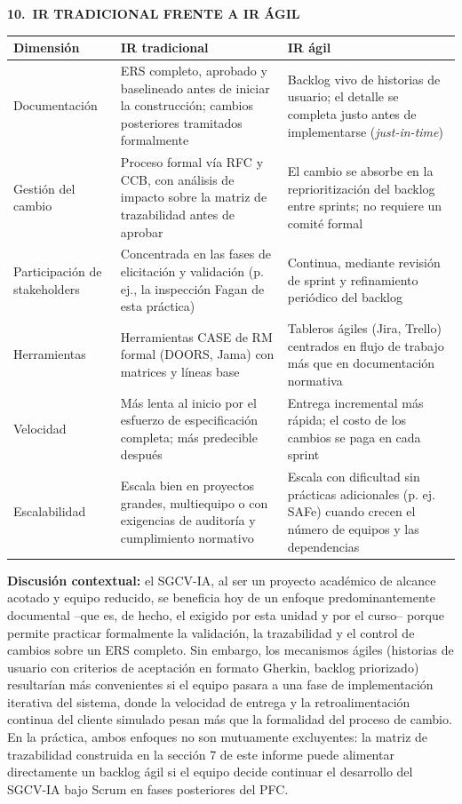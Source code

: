 \documentclass[11pt,a4paper]{article}
\newcommand{\seccion}[2]{%
  \vspace{0.6cm}
  \noindent
  {\color{white}\colorbox{uteqverde}{%
    \parbox[c][1.05cm]{\dimexpr\textwidth-16pt\relax}{%
      \hspace{6pt}\textbf{\large #1\ #2}%
    }%
  }}%
  \vspace{0.35cm}
  \par
}
\begin{document}
\seccion{10.}{IR TRADICIONAL FRENTE A IR ÁGIL}

\begin{longtable}{p{2.6cm}p{4.7cm}p{4.7cm}}
\toprule
\textbf{Dimensión} & \textbf{IR tradicional} & \textbf{IR ágil} \\
\midrule
\endhead
Documentación &
ERS completo, aprobado y baselineado antes de iniciar la construcción; cambios
posteriores tramitados formalmente &
Backlog vivo de historias de usuario; el detalle se completa justo antes de
implementarse (\textit{just-in-time}) \\
\addlinespace
Gestión del cambio &
Proceso formal vía RFC y CCB, con análisis de impacto sobre la matriz de
trazabilidad antes de aprobar &
El cambio se absorbe en la reprioritización del backlog entre sprints; no
requiere un comité formal \\
\addlinespace
Participación de stakeholders &
Concentrada en las fases de elicitación y validación (p. ej., la inspección
Fagan de esta práctica) &
Continua, mediante revisión de sprint y refinamiento periódico del backlog \\
\addlinespace
Herramientas &
Herramientas CASE de RM formal (DOORS, Jama) con matrices y líneas base &
Tableros ágiles (Jira, Trello) centrados en flujo de trabajo más que en
documentación normativa \\
\addlinespace
Velocidad &
Más lenta al inicio por el esfuerzo de especificación completa; más predecible
después &
Entrega incremental más rápida; el costo de los cambios se paga en cada sprint \\
\addlinespace
Escalabilidad &
Escala bien en proyectos grandes, multiequipo o con exigencias de auditoría y
cumplimiento normativo &
Escala con dificultad sin prácticas adicionales (p. ej. SAFe) cuando crecen el
número de equipos y las dependencias \\
\bottomrule
\end{longtable}

\textbf{Discusión contextual:} el SGCV-IA, al ser un proyecto académico de
alcance acotado y equipo reducido, se beneficia hoy de un enfoque
predominantemente documental --que es, de hecho, el exigido por esta unidad y
por el curso-- porque permite practicar formalmente la validación, la
trazabilidad y el control de cambios sobre un ERS completo. Sin embargo, los
mecanismos ágiles (historias de usuario con criterios de aceptación en formato
Gherkin, backlog priorizado) resultarían más convenientes si el equipo pasara a
una fase de implementación iterativa del sistema, donde la velocidad de entrega
y la retroalimentación continua del cliente simulado pesan más que la
formalidad del proceso de cambio. En la práctica, ambos enfoques no son
mutuamente excluyentes: la matriz de trazabilidad construida en la sección 7 de
este informe puede alimentar directamente un backlog ágil si el equipo decide
continuar el desarrollo del SGCV-IA bajo Scrum en fases posteriores del PFC.
\end{document}
